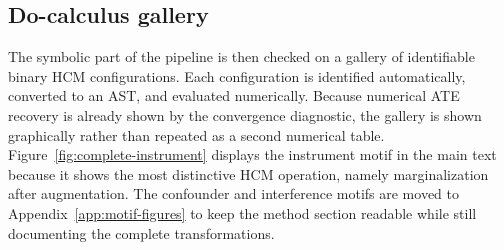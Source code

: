 \documentclass[unnumsec,webpdf,contemporary,large]{oup-authoring-template}%
\theoremstyle{thmstyleone}%
\theoremstyle{thmstyletwo}%
\theoremstyle{thmstylethree}%
\begin{document}
\subsection{Do-calculus gallery}

The symbolic part of the pipeline is then checked on a gallery of identifiable binary HCM configurations.
Each configuration is identified automatically, converted to an AST, and evaluated numerically.
Because numerical ATE recovery is already shown by the convergence diagnostic, the gallery is shown graphically rather than repeated as a second numerical table.
Figure~\ref{fig:complete-instrument} displays the instrument motif in the main text because it shows the most distinctive HCM operation, namely marginalization after augmentation. The confounder and interference motifs are moved to Appendix~\ref{app:motif-figures} to keep the method section readable while still documenting the complete transformations.
\end{document}
